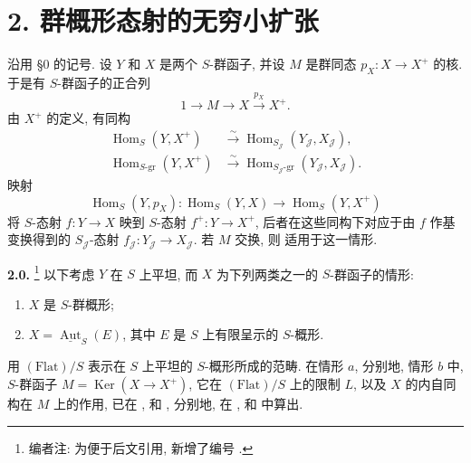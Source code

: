 
\setcounter{footnote}{51}

\section*{2. 群概形态射的无穷小扩张}

沿用 \S0 的记号. 设 \(Y\) 和 \(X\) 是两个 \(S\)-群函子,
并设 \(M\) 是群同态 \(p_X:X\to X^+\) 的核.
于是有 \(S\)-群函子的正合列
\[
 1\longrightarrow M\longrightarrow X\xrightarrow{p_X}X^+.
\]
由 \(X^+\) 的定义, 有同构
\begin{align*}
 \operatorname{Hom}_S(Y,X^+)
  &\xrightarrow{\sim}\operatorname{Hom}_{S_{\mathscr J}}(Y_{\mathscr J},X_{\mathscr J}),\\
 \operatorname{Hom}_{S\text{-}\mathrm{gr}}(Y,X^+)
  &\xrightarrow{\sim}
    \operatorname{Hom}_{S_{\mathscr J}\text{-}\mathrm{gr}}
    (Y_{\mathscr J},X_{\mathscr J}).
\end{align*}
映射
\[
 \operatorname{Hom}_S(Y,p_X):
 \operatorname{Hom}_S(Y,X)\longrightarrow\operatorname{Hom}_S(Y,X^+)
\]
将 \(S\)-态射 \(f:Y\to X\) 映到 \(S\)-态射
\(f^+:Y\to X^+\), 后者在这些同构下对应于由 \(f\) 作基变换得到的
\(S_{\mathscr J}\)-态射
\(f_{\mathscr J}:Y_{\mathscr J}\to X_{\mathscr J}\).
若 \(M\) 交换, 则 
适用于这一情形.

\medskip
\noindent{}\textbf{2.0.}
\footnote{编者注: 为便于后文引用, 新增了编号
.}
以下考虑 \(Y\) 在 \(S\) 上平坦, 而 \(X\) 为下列两类之一的
\(S\)-群函子的情形:
\begin{enumerate}
\item[\(a\)] \(X\) 是 \(S\)-群概形;
\item[\(b\)]
  \(X=\underline{\operatorname{Aut}}_S(E)\), 其中 \(E\) 是
  \(S\) 上有限呈示的 \(S\)-概形.
\end{enumerate}
用 \((\mathrm{Flat})/S\) 表示在 \(S\) 上平坦的
\(S\)-概形所成的范畴. 在情形 \(a\), 分别地, 情形 \(b\) 中,
\(S\)-群函子 \(M=\operatorname{Ker}(X\to X^+)\),
它在 \((\mathrm{Flat})/S\) 上的限制 \(L\),
以及 \(X\) 的内自同构在 \(M\) 上的作用,
已在 ,
 和 ,
分别地, 在 ,
 和 
中算出.

